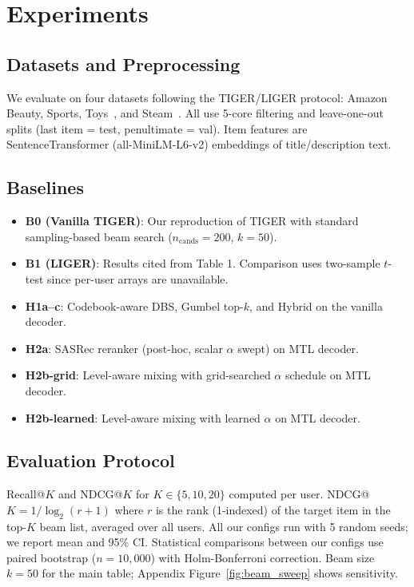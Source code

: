 \section{Experiments}
\label{sec:experiments}

\subsection{Datasets and Preprocessing}

We evaluate on four datasets following the TIGER/LIGER protocol: Amazon Beauty, Sports, Toys~\cite{rajput2023tiger}, and Steam~\cite{yang2024liger}. All use 5-core filtering and leave-one-out splits (last item = test, penultimate = val). Item features are SentenceTransformer (all-MiniLM-L6-v2) embeddings of title/description text.


\subsection{Baselines}

\begin{itemize}
  \item \textbf{B0 (Vanilla TIGER)}: Our reproduction of TIGER with standard sampling-based beam search ($n_\text{cands}=200$, $k=50$).
  \item \textbf{B1 (LIGER)}: Results cited from \citet{yang2024liger} Table 1. Comparison uses two-sample $t$-test since per-user arrays are unavailable.
  \item \textbf{H1a–c}: Codebook-aware DBS, Gumbel top-$k$, and Hybrid on the vanilla decoder.
  \item \textbf{H2a}: SASRec reranker (post-hoc, scalar $\alpha$ swept) on MTL decoder.
  \item \textbf{H2b-grid}: Level-aware mixing with grid-searched $\alpha$ schedule on MTL decoder.
  \item \textbf{H2b-learned}: Level-aware mixing with learned $\alpha$ on MTL decoder.
\end{itemize}

\subsection{Evaluation Protocol}

Recall@$K$ and NDCG@$K$ for $K \in \{5, 10, 20\}$ computed per user. NDCG@$K = 1/\log_2(r+1)$ where $r$ is the rank (1-indexed) of the target item in the top-$K$ beam list, averaged over all users. All our configs run with 5 random seeds; we report mean and 95\% CI. Statistical comparisons between our configs use paired bootstrap ($n=10{,}000$) with Holm-Bonferroni correction. Beam size $k=50$ for the main table; Appendix Figure~\ref{fig:beam_sweep} shows sensitivity.

